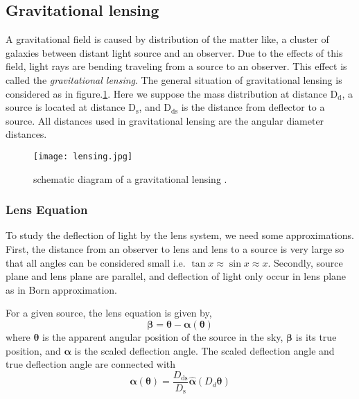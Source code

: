 \subsection{Gravitational lensing}
A gravitational field is caused by distribution of the matter like, a cluster of galaxies between distant light source and an observer. Due to the effects of this field, light rays are bending traveling from a source to an observer. This effect is called the \textit{gravitational lensing}. The general situation of gravitational lensing is considered as in figure.\ref{Fig:lensing}. Here we suppose the mass distribution at distance $ \text{D}_{\text{d}}$, a source is located at distance $ \text{D}_{\text{s}} $, and $ \text{D}_{\text{ds}}$ is the distance from deflector to a source. All distances used in gravitational lensing are the angular diameter distances.
\begin{figure}[H]
	\centering
	\texttt{[image: lensing.jpg]}
	\caption{schematic diagram of a gravitational lensing \cite{manual}.}%
	\label{Fig:lensing}
\end{figure}

\subsubsection{Lens Equation}
To study the deflection of light by the lens system, we need some approximations. First, the distance from an observer to lens and lens to a source is very large so that all angles can be considered small i.e. $\tan x \approx \sin x \approx x$. Secondly, source plane and lens plane are parallel, and deflection of light only occur in lens plane as in Born approximation.

For a given source, the lens equation is given by,
\begin{equation}
\pmb\beta =\pmb\theta - \pmb\alpha (\pmb\theta)
\label{LEquation}
\end{equation}
\noindent
where $\pmb\theta$ is the apparent angular position of the source in the sky, $\pmb\beta$ is its true position, and $\pmb\alpha $ is the scaled deflection angle.
The scaled deflection angle and true deflection angle are connected with~\cite{manual}
\begin{equation}
\pmb\alpha(\pmb\theta)=\frac{{D}_{\text{ds}}}{{D}_{\text{s}}} \hat{\pmb\alpha}(D_{d}\pmb\theta)
\end{equation}

